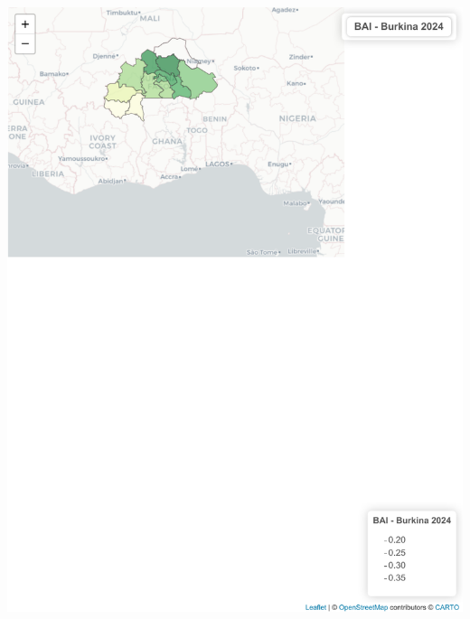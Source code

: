 \documentclass[
]{book}
\begin{document}
\includegraphics{Atlas-Spectral-Sahel_files/figure-latex/bai-cartes-2.pdf}
\end{document}
